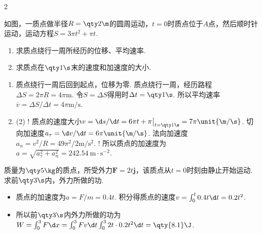 \begin{paracol}{2}
\begin{problem}
    如图，一质点做半径$R=\qty2\m$的圆周运动，$t=0$时质点位于$A$点，然后顺时针运动，运动方程$S=3\pi t^2+\pi t$.
    \begin{enumerate}
        \item 求质点绕行一周所经历的位移、平均速率.
        \item 求质点在$\qty1\s$末的速度和加速度的大小.
    \end{enumerate}
    \switchcolumn\vspace*{\fill}\centering
    \vspace*{\fill}
\end{problem}
\end{paracol}
\begin{solution}\leavevmode
    \begin{enumerate}
        \item 质点绕行一周后回到起点，位移为零. 质点绕行一周，经历路程$\Delta S=2\pi R=4\pi\unit\m$. 令$S=\Delta S$得用时$\Delta t=\qty1\s$. 所以平均速率$\overline{v}=\Delta S/\Delta t=4\pi\unit{\m/\s}$.
        \item
        \begin{tasks}[label=\labelitemi](2)
            \task! 质点的速度大小$v=\d s/\d t=6\pi t+\pi\big|_{t=\qty1\s}=7\pi\unit{\m/\s}$.
            \task 切向加速度$a_\tau=\d v/\d t=6\pi\unit{\m/\s}$.
            \task 法向加速度$a_n=v^2/R=49\pi^2/2\unit{\m/\s^2}$.
            \task! 所以质点的加速度为$a=\sqrt{a_{\tau}^2+a_n^2}=\qty{242.54}{\m\cdot\s^{-2}}$.
        \end{tasks}
    \end{enumerate}
\end{solution}

\begin{problem}
    质量为$\qty5\kg$的质点，所受外力$\bm F=2t\bm j$，该质点从$t=0$时刻由静止开始运动. 求前$\qty3\s$内，外力所做的功.
\end{problem}
\begin{solution}\leavevmode
    \begin{itemize}
        \item 质点的加速度为$a=F/m=0.4t$. 积分得质点的速度$v=\int_0^t{0.4 t\d t}=0.2t^2$.
        \item 所以前$\qty3\s$内外力所做的功为$W=\int_0^3F\d x=\int_0^3Fv\d t\int_0^3{2t\cdot 0.2t^2\d t}=\qty{8.1}\J$.
    \end{itemize}
\end{solution}

